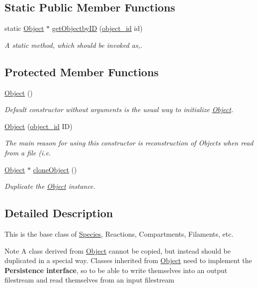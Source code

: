 \subsection*{Static Public Member Functions}
\begin{DoxyCompactItemize}
\item 
static \hyperlink{classObject}{Object} $\ast$ \hyperlink{classObject_a0fcfbdfa4439b322c375a5f99c3dfabd}{get\-Objectby\-I\-D} (\hyperlink{Object_8h_a0b56ddf6ace42572542aae1f2c364e05}{object\-\_\-id} id)
\begin{DoxyCompactList}\small\item\em A static method, which should be invoked as,. \end{DoxyCompactList}\end{DoxyCompactItemize}
\subsection*{Protected Member Functions}
\begin{DoxyCompactItemize}
\item 
\hyperlink{classObject_a40860402e64d8008fb42329df7097cdb}{Object} ()
\begin{DoxyCompactList}\small\item\em Default constructor without arguments is the usual way to initialize \hyperlink{classObject}{Object}. \end{DoxyCompactList}\item 
\hyperlink{classObject_a7c0918b6f13db00e14c729dc954d320c}{Object} (\hyperlink{Object_8h_a0b56ddf6ace42572542aae1f2c364e05}{object\-\_\-id} I\-D)
\begin{DoxyCompactList}\small\item\em The main reason for using this constructor is reconstruction of Objects when read from a file (i.\-e. \end{DoxyCompactList}\item 
\hyperlink{classObject}{Object} $\ast$ \hyperlink{classObject_a11a1dd53ef68fc4a1ad8c6175132c8d5}{clone\-Object} ()
\begin{DoxyCompactList}\small\item\em Duplicate the \hyperlink{classObject}{Object} instance. \end{DoxyCompactList}\end{DoxyCompactItemize}


\subsection{Detailed Description}
This is the base class of \hyperlink{classSpecies}{Species}, Reactions, Compartments, Filaments, etc. \begin{DoxyNote}{Note}
A class derived from \hyperlink{classObject}{Object} cannot be copied, but instead should be duplicated in a special way. Classes inherited from \hyperlink{classObject}{Object} need to implement the {\bfseries Persistence interface}, so to be able to write themselves into an output filestream and read themselves from an input filestream 
\end{DoxyNote}


